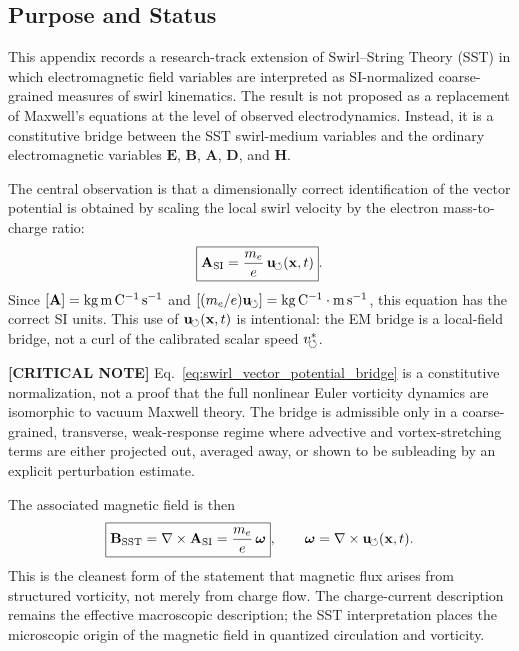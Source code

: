 \subsection{Purpose and Status}
    
    This appendix records a research-track extension of Swirl--String Theory
    (SST) in which electromagnetic field variables are interpreted as
    SI-normalized coarse-grained measures of swirl kinematics.  The result is
    not proposed as a replacement of Maxwell's equations at the level of
    observed electrodynamics.  Instead, it is a constitutive bridge between
    the SST swirl-medium variables and the ordinary electromagnetic variables
    \(\mathbf{E}\), \(\mathbf{B}\), \(\mathbf{A}\), \(\mathbf{D}\), and
    \(\mathbf{H}\).
    
    The central observation is that a dimensionally correct identification of
    the vector potential is obtained by scaling the local swirl velocity by the
    electron mass-to-charge ratio:
    \begin{equation}
        \boxed{
            \mathbf{A}_{\rm SI}
            =
            \frac{m_e}{e}\,
            \mathbf{u}_{\!\boldsymbol{\circlearrowleft}}(\mathbf{x},t)
        } .
        \label{eq:swirl_vector_potential_bridge}
    \end{equation}
    Since \([\mathbf{A}]={\rm kg\,m\,C^{-1}\,s^{-1}}\) and
    \([(m_e/e)\mathbf{u}_{\!\boldsymbol{\circlearrowleft}}]={\rm kg\,C^{-1}}\cdot{\rm m\,s^{-1}}\), this equation
    has the correct SI units. This use of \(\mathbf{u}_{\!\boldsymbol{\circlearrowleft}}(\mathbf{x},t)\) is intentional: the EM bridge is a local-field bridge, not a curl of the calibrated scalar speed \(v_{\!\boldsymbol{\circlearrowleft}}^{\ast}\).

    \textbf{[CRITICAL NOTE]} Eq.~\eqref{eq:swirl_vector_potential_bridge} is a constitutive normalization, not a proof that the full nonlinear Euler vorticity dynamics are isomorphic to vacuum Maxwell theory. The bridge is admissible only in a coarse-grained, transverse, weak-response regime where advective and vortex-stretching terms are either projected out, averaged away, or shown to be subleading by an explicit perturbation estimate.
    
    The associated magnetic field is then
    \begin{equation}
        \boxed{
            \mathbf{B}_{\rm SST}
            =
            \nabla\times\mathbf{A}_{\rm SI}
            =
            \frac{m_e}{e}\,
            \boldsymbol{\omega}
        },
        \qquad
        \boldsymbol{\omega}
        =
        \nabla\times\mathbf{u}_{\!\boldsymbol{\circlearrowleft}}(\mathbf{x},t) .
        \label{eq:B_from_vorticity}
    \end{equation}
    This is the cleanest form of the statement that magnetic flux arises from
    structured vorticity, not merely from charge flow.  The charge-current
    description remains the effective macroscopic description; the SST
    interpretation places the microscopic origin of the magnetic field in
    quantized circulation and vorticity.

